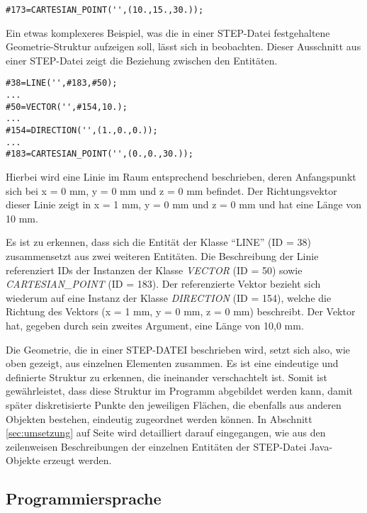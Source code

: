 \begin{lstlisting}[captionpos=b, style=customc, caption=Beschreibung eines Punktes in STEP, label=lis:simplestp]
#173=CARTESIAN_POINT('',(10.,15.,30.));
\end{lstlisting}

Ein etwas komplexeres Beispiel, was die in einer STEP-Datei festgehaltene Geometrie-Struktur aufzeigen soll, lässt sich in  beobachten. Dieser Ausschnitt aus einer STEP-Datei zeigt die Beziehung zwischen den Entitäten. 


\begin{lstlisting}[captionpos=b, style=customc, caption=Beschreibung einer Linie in STEP, label=lis:exmpllinestp]
#38=LINE('',#183,#50);
...
#50=VECTOR('',#154,10.);
...
#154=DIRECTION('',(1.,0.,0.));
...
#183=CARTESIAN_POINT('',(0.,0.,30.));
\end{lstlisting} 

Hierbei wird eine Linie im Raum entsprechend beschrieben, deren Anfangspunkt sich bei x = 0 mm, y = 0 mm und z = 0 mm befindet. Der Richtungsvektor dieser Linie zeigt in x = 1 mm, y = 0 mm und z = 0 mm und hat eine Länge von 10 mm.

Es ist zu erkennen, dass sich die Entität der Klasse "`LINE"' (ID = 38) zusammensetzt aus zwei weiteren Entitäten. Die Beschreibung der Linie referenziert IDs der Instanzen der Klasse \textit{VECTOR} (ID = 50) sowie \textit{CARTESIAN\_POINT} (ID = 183). Der referenzierte Vektor bezieht sich wiederum auf eine Instanz der Klasse \textit{DIRECTION} (ID = 154), welche die Richtung des Vektors (x = 1 mm, y = 0 mm, z = 0 mm) beschreibt. Der Vektor hat, gegeben durch sein zweites Argument, eine Länge von 10,0 mm.

Die Geometrie, die in einer STEP-DATEI beschrieben wird, setzt sich also, wie oben gezeigt, aus einzelnen Elementen zusammen. Es ist eine eindeutige und definierte Struktur zu erkennen, die ineinander verschachtelt ist. Somit ist gewährleistet, dass diese Struktur im Programm abgebildet werden kann, damit später diskretisierte Punkte den jeweiligen Flächen, die ebenfalls aus anderen Objekten bestehen, eindeutig zugeordnet werden können. 
In Abschnitt \ref{sec:umsetzung} auf Seite \pageref{sec:string2entity} wird detailliert darauf eingegangen, wie aus den zeilenweisen Beschreibungen der einzelnen Entitäten der STEP-Datei Java-Objekte erzeugt werden.              

\subsection{Programmiersprache} 
 
